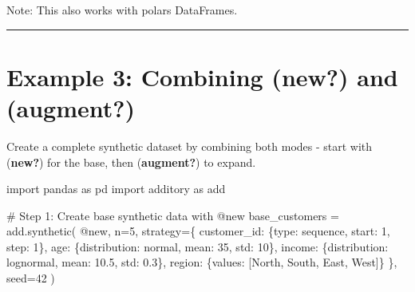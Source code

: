 \documentclass[
  letterpaper,
]{scrbook}
\newenvironment{Shaded}{\begin{snugshade}}{\end{snugshade}}
\newcommand{\CommentTok}[1]{\textcolor[rgb]{0.37,0.37,0.37}{#1}}
\newcommand{\DecValTok}[1]{\textcolor[rgb]{0.68,0.00,0.00}{#1}}
\newcommand{\FloatTok}[1]{\textcolor[rgb]{0.68,0.00,0.00}{#1}}
\newcommand{\ImportTok}[1]{\textcolor[rgb]{0.00,0.46,0.62}{#1}}
\newcommand{\NormalTok}[1]{\textcolor[rgb]{0.00,0.23,0.31}{#1}}
\newcommand{\OperatorTok}[1]{\textcolor[rgb]{0.37,0.37,0.37}{#1}}
\newcommand{\StringTok}[1]{\textcolor[rgb]{0.13,0.47,0.30}{#1}}
\begin{document}
Note: This also works with polars DataFrames.

\begin{center}\rule{0.5\linewidth}{0.5pt}\end{center}

\section{\texorpdfstring{Example 3: Combining (\textbf{new?}) and
(\textbf{augment?})}{Example 3: Combining (new?) and (augment?)}}\label{example-3-combining-new-and-augment}

Create a complete synthetic dataset by combining both modes - start with
(\textbf{new?}) for the base, then (\textbf{augment?}) to expand.

\begin{Shaded}
\begin{Highlighting}[]
\ImportTok{import}\NormalTok{ pandas }\ImportTok{as}\NormalTok{ pd}
\ImportTok{import}\NormalTok{ additory }\ImportTok{as}\NormalTok{ add}

\CommentTok{\# Step 1: Create base synthetic data with @new}
\NormalTok{base\_customers }\OperatorTok{=}\NormalTok{ add.synthetic(}
    \StringTok{\textquotesingle{}@new\textquotesingle{}}\NormalTok{,}
\NormalTok{    n}\OperatorTok{=}\DecValTok{5}\NormalTok{,}
\NormalTok{    strategy}\OperatorTok{=}\NormalTok{\{}
        \StringTok{\textquotesingle{}customer\_id\textquotesingle{}}\NormalTok{: \{}\StringTok{\textquotesingle{}type\textquotesingle{}}\NormalTok{: }\StringTok{\textquotesingle{}sequence\textquotesingle{}}\NormalTok{, }\StringTok{\textquotesingle{}start\textquotesingle{}}\NormalTok{: }\DecValTok{1}\NormalTok{, }\StringTok{\textquotesingle{}step\textquotesingle{}}\NormalTok{: }\DecValTok{1}\NormalTok{\},}
        \StringTok{\textquotesingle{}age\textquotesingle{}}\NormalTok{: \{}\StringTok{\textquotesingle{}distribution\textquotesingle{}}\NormalTok{: }\StringTok{\textquotesingle{}normal\textquotesingle{}}\NormalTok{, }\StringTok{\textquotesingle{}mean\textquotesingle{}}\NormalTok{: }\DecValTok{35}\NormalTok{, }\StringTok{\textquotesingle{}std\textquotesingle{}}\NormalTok{: }\DecValTok{10}\NormalTok{\},}
        \StringTok{\textquotesingle{}income\textquotesingle{}}\NormalTok{: \{}\StringTok{\textquotesingle{}distribution\textquotesingle{}}\NormalTok{: }\StringTok{\textquotesingle{}lognormal\textquotesingle{}}\NormalTok{, }\StringTok{\textquotesingle{}mean\textquotesingle{}}\NormalTok{: }\FloatTok{10.5}\NormalTok{, }\StringTok{\textquotesingle{}std\textquotesingle{}}\NormalTok{: }\FloatTok{0.3}\NormalTok{\},}
        \StringTok{\textquotesingle{}region\textquotesingle{}}\NormalTok{: \{}\StringTok{\textquotesingle{}values\textquotesingle{}}\NormalTok{: [}\StringTok{\textquotesingle{}North\textquotesingle{}}\NormalTok{, }\StringTok{\textquotesingle{}South\textquotesingle{}}\NormalTok{, }\StringTok{\textquotesingle{}East\textquotesingle{}}\NormalTok{, }\StringTok{\textquotesingle{}West\textquotesingle{}}\NormalTok{]\}}
\NormalTok{    \},}
\NormalTok{    seed}\OperatorTok{=}\DecValTok{42}
\NormalTok{)}


\end{Highlighting}
\end{Shaded}
\end{document}
